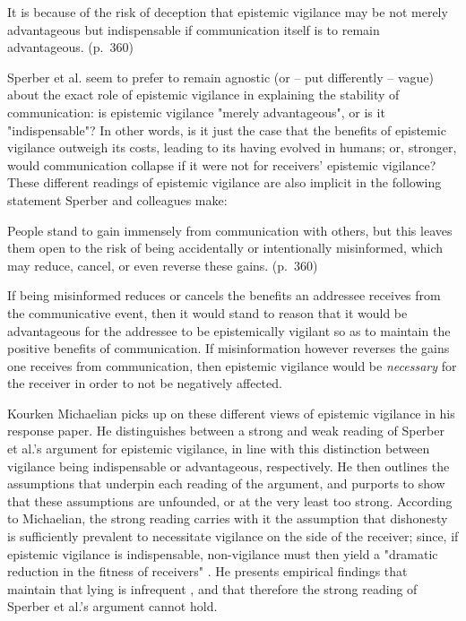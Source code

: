 \begin{quoting}
    It is because of the risk of deception that epistemic vigilance may be not merely advantageous but indispensable if communication itself is to remain advantageous.
\hfill (p.~360)
\end{quoting}
Sperber et al. seem to prefer to remain agnostic (or -- put differently -- vague) about the exact role of epistemic vigilance in explaining the stability of communication: is epistemic vigilance "merely advantageous", or is it "indispensable"? In other words, is it just the case that the benefits of epistemic vigilance outweigh its costs, leading to its having evolved in humans; or, stronger, would communication collapse if it were not for receivers' epistemic vigilance?
These different readings of epistemic vigilance are also implicit in the following statement Sperber and colleagues make:
\begin{quoting}
    People stand to gain immensely from communication with others, but this leaves them open to the risk of being accidentally or intentionally misinformed, which may reduce, cancel, or even reverse these gains.
\hfill (p.~360)
\end{quoting}
If being misinformed reduces or cancels the benefits an addressee receives from the communicative event, then it would stand to reason that it would be advantageous for the addressee to be epistemically vigilant so as to maintain the positive benefits of communication. If misinformation however reverses the gains one receives from communication, then epistemic vigilance would be \emph{necessary} for the receiver in order to not be negatively affected.

Kourken Michaelian picks up on these different views of epistemic vigilance in his \citeyear{Michaelian13} response paper. He distinguishes between a strong and weak reading of Sperber et al.'s argument for epistemic vigilance, in line with this distinction between vigilance being indispensable or advantageous, respectively.
He then outlines the assumptions that underpin each reading of the argument, and purports to show that these assumptions are unfounded, or at the very least too strong.
According to Michaelian, the strong reading carries with it the assumption that dishonesty is sufficiently prevalent to necessitate vigilance on the side of the receiver; since, if epistemic vigilance is indispensable, non-vigilance must then yield a "dramatic reduction in the fitness of receivers" \citep[p.~39]{Michaelian13}. He presents empirical findings that maintain that lying is infrequent \citep{Serota10}, and that therefore the strong reading of Sperber et al.'s argument cannot hold.

